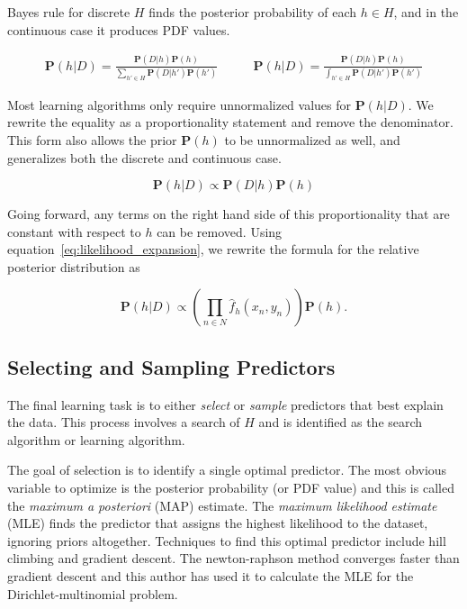 \documentclass[twoside]{article}
\begin{document}
Bayes rule for discrete \(H\) finds the posterior probability of each \(h \in H\), and in the continuous case it produces PDF values.

\begin{align}
\mathbf{P}(h|D)=\frac{\mathbf{P}(D|h)\mathbf{P}(h)}{\sum_{h' \in H}\mathbf{P}(D|h')\mathbf{P}(h')} &
\qquad\mathbf{P}(h|D)=\frac{\mathbf{P}(D|h)\mathbf{P}(h)}{\int_{h' \in H}\mathbf{P}(D|h')\mathbf{P}(h')}
\end{align}

Most learning algorithms only require unnormalized values for \(\mathbf{P}(h|D)\). We rewrite the equality as a proportionality statement and remove the denominator. This form also allows the prior \(\mathbf{P}(h)\) to be unnormalized as well, and generalizes both the discrete and continuous case.

\begin{equation}
\label{eq:bayes}
\mathbf{P}(h|D)\propto\mathbf{P}(D|h)\mathbf{P}(h)
\end{equation}

Going forward, any terms on the right hand side of this proportionality that are constant with respect to \(h\) can be removed. Using equation~\eqref{eq:likelihood_expansion}, we rewrite the formula for the relative posterior distribution as

\begin{equation}
\label{eq:bayes_likelihood_expanded}
\mathbf{P}(h|D)\propto \left( \prod_{n \in N} \hat{f}_h(x_n,y_n) \right) \mathbf{P}(h).
\end{equation}

\subsection{Selecting and Sampling Predictors}

The final learning task is to either \textit{select} or \textit{sample} predictors that best explain the data. This process involves a search of \(H\) and is identified as the search algorithm or learning algorithm.

The goal of selection is to identify a single optimal predictor. The most obvious variable to optimize is the posterior probability (or PDF value) and this is called the \textit{maximum a posteriori} (MAP) estimate. The \textit{maximum likelihood estimate} (MLE) finds the predictor that assigns the highest likelihood to the dataset, ignoring priors altogether. Techniques to find this optimal predictor include hill climbing and gradient descent. The newton-raphson method converges faster than gradient descent and this author has used it to calculate the MLE for the Dirichlet-multinomial problem.\cite{sklar_dirichlet}
\end{document}
